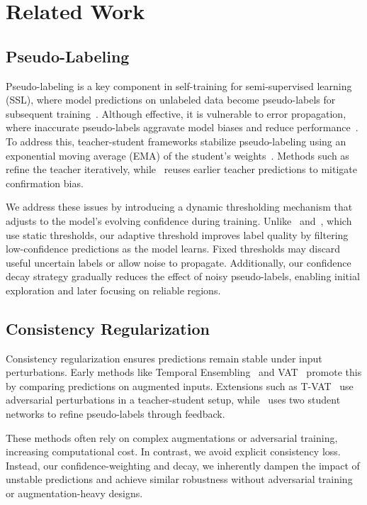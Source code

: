 \section{Related Work}
\subsection{Pseudo-Labeling}
Pseudo-labeling is a key component in self-training for semi-supervised learning (SSL), where model predictions on unlabeled data become pseudo-labels for subsequent training~\cite{lee2013pseudo}. Although effective, it is vulnerable to error propagation, where inaccurate pseudo-labels aggravate model biases and reduce performance~\cite{zhang2020semi}. To address this, teacher-student frameworks stabilize pseudo-labeling using an exponential moving average (EMA) of the student’s weights~\cite{tarvainen2017mean}. Methods such as~\cite{yang2022st++} refine the teacher iteratively, while~\cite{shin2024revisiting} reuses earlier teacher predictions to mitigate confirmation bias.

We address these issues by introducing a dynamic thresholding mechanism that adjusts to the model’s evolving confidence during training. Unlike~\cite{yang2022st++} and~\cite{shin2024revisiting}, which use static thresholds, our adaptive threshold improves label quality by filtering low-confidence predictions as the model learns. Fixed thresholds may discard useful uncertain labels or allow noise to propagate. Additionally, our confidence decay strategy gradually reduces the effect of noisy pseudo-labels, enabling initial exploration and later focusing on reliable regions.

\subsection{Consistency Regularization}
Consistency regularization ensures predictions remain stable under input perturbations. Early methods like Temporal Ensembling~\cite{laine2017temporal} and VAT~\cite{miyato2018virtual} promote this by comparing predictions on augmented inputs. Extensions such as T-VAT~\cite{wang2022semi} use adversarial perturbations in a teacher-student setup, while~\cite{cho2024interactive} uses two student networks to refine pseudo-labels through feedback.

These methods often rely on complex augmentations or adversarial training, increasing computational cost. In contrast, we avoid explicit consistency loss. Instead, our confidence-weighting and decay, we inherently dampen the impact of unstable predictions and achieve similar robustness without adversarial training or augmentation-heavy designs.

